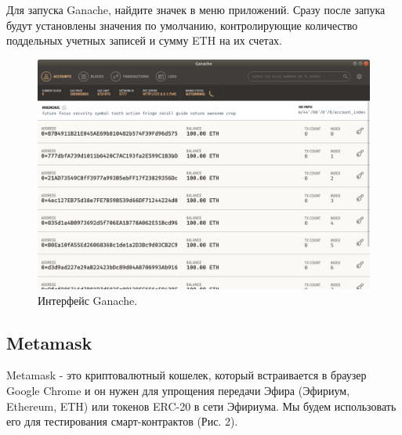 \documentclass{article}
\begin{document}
Для запуска Ganache, найдите значек в меню приложений. Сразу после запука будут установлены значения по умолчанию, контролирующие количество поддельных учетных записей и сумму ETH на их счетах.

\begin{figure}
    \centering
    \includegraphics[scale=0.4]{ganache_1}
    \caption{Интерфейс Ganache.}
    \label{fig:ganache_1}
\end{figure}

\subsection{Metamask}

Metamask -  это криптовалютный кошелек, который встраивается в браузер Google Chrome и он нужен для упрощения передачи Эфира (Эфириум,  Ethereum, ETH)  или токенов ERC-20  в сети Эфириума. Мы будем использовать его для тестирования смарт-контрактов (Рис. 2).
\end{document}

